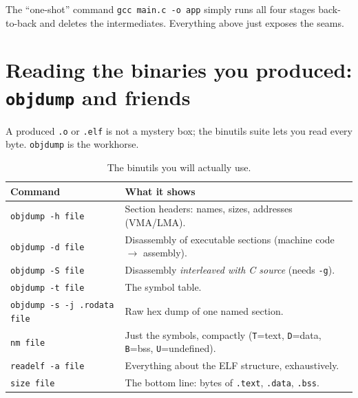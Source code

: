 \documentclass[11pt,a4paper,oneside]{book}
\newcommand{\code}[1]{\texttt{#1}}
\begin{document}
\begin{note}
The ``one-shot'' command \code{gcc main.c -o app} simply runs all four stages
back-to-back and deletes the intermediates. Everything above just exposes the
seams.
\end{note}

\section{Reading the binaries you produced: \texttt{objdump} and friends}

A produced \code{.o} or \code{.elf} is not a mystery box; the binutils suite
lets you read every byte. \code{objdump} is the workhorse.

\begin{table}[h]
\centering
\caption{The binutils you will actually use.}
\label{tab:binutils}
\small
\begin{tabular}{@{}lp{9.5cm}@{}}
\toprule
\textbf{Command} & \textbf{What it shows}\\
\midrule
\code{objdump -h file}   & Section headers: names, sizes, addresses (VMA/LMA).\\
\code{objdump -d file}   & Disassembly of executable sections (machine code $\to$ assembly).\\
\code{objdump -S file}   & Disassembly \emph{interleaved with C source} (needs \code{-g}).\\
\code{objdump -t file}   & The symbol table.\\
\code{objdump -s -j .rodata file} & Raw hex dump of one named section.\\
\code{nm file}           & Just the symbols, compactly (\code{T}=text, \code{D}=data, \code{B}=bss, \code{U}=undefined).\\
\code{readelf -a file}   & Everything about the ELF structure, exhaustively.\\
\code{size file}         & The bottom line: bytes of \code{.text}, \code{.data}, \code{.bss}.\\
\bottomrule
\end{tabular}
\end{table}
\end{document}
